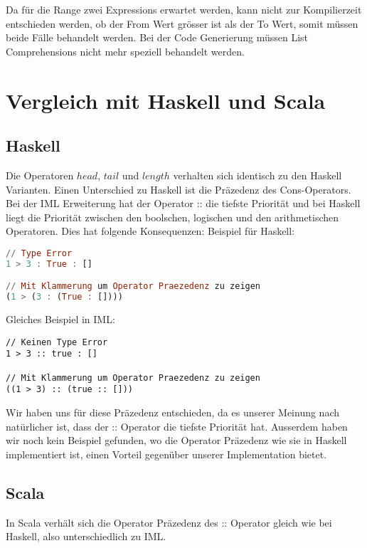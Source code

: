 \documentclass[a4paper,notitlepage,oneside]{article}
\begin{document}
Da für die Range zwei Expressions erwartet werden, kann nicht zur Kompilierzeit entschieden werden, ob der From Wert grösser ist als der To Wert, somit müssen beide Fälle behandelt werden. Bei der Code Generierung müssen List Comprehensions nicht mehr speziell behandelt werden.
\newpage
\section{Vergleich mit Haskell und Scala}
\subsection{Haskell}
Die Operatoren $head$, $tail$ und $length$ verhalten sich identisch zu den Haskell Varianten. Einen Unterschied zu Haskell ist die Präzedenz des Cons-Operators. Bei der IML Erweiterung hat der Operator :: die tiefste Priorität und bei Haskell liegt die Priorität zwischen den boolschen, logischen und den arithmetischen Operatoren. Dies hat folgende Konsequenzen:
\newline
\newline
Beispiel für Haskell: 

\begin{lstlisting}[language=haskell, caption=Ungültige Cons Operation in Haskell]
// Type Error
1 > 3 : True : [] 

// Mit Klammerung um Operator Praezedenz zu zeigen
(1 > (3 : (True : []))) 
\end{lstlisting}

\raggedright
Gleiches Beispiel in IML:

\begin{lstlisting}[language=iml, caption=Gültige Listen Konkatenation in IML]
// Keinen Type Error
1 > 3 :: true : [] 

// Mit Klammerung um Operator Praezedenz zu zeigen
((1 > 3) :: (true :: [])) 
\end{lstlisting}
Wir haben uns für diese Präzedenz entschieden, da es unserer Meinung nach natürlicher ist, dass der :: Operator die tiefste Priorität hat.
Ausserdem haben wir noch kein Beispiel gefunden, wo die Operator Präzedenz wie sie in Haskell implementiert ist, einen Vorteil gegenüber unserer Implementation bietet.

\subsection{Scala}
In Scala verhält sich die Operator Präzedenz des :: Operator gleich wie bei Haskell, also unterschiedlich zu IML.
\end{document}
